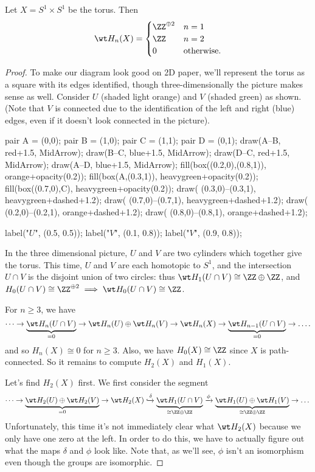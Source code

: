 \begin{proposition}
	Let $X = S^1 \times S^1$ be the torus.
	Then
	\[
		\wt H_n(X)
		=
		\begin{cases}
			\ZZ^{\oplus 2} & n = 1 \\
			\ZZ & n = 2 \\
			0 & \text{otherwise}.
		\end{cases}
	\]
\end{proposition}
\begin{proof}
	To make our diagram look good on 2D paper,
	we'll represent the torus as a square with its edges identified,
	though three-dimensionally the picture makes sense as well.
	Consider $U$ (shaded light orange) and $V$ (shaded green) as shown.
	(Note that $V$ is connected due to the identification of the left and right (blue) edges,
	even if it doesn't look connected in the picture).
	\begin{center}
		\begin{asy}
			pair A = (0,0);
			pair B = (1,0);
			pair C = (1,1);
			pair D = (0,1);
			draw(A--B, red+1.5, MidArrow);
			draw(B--C, blue+1.5, MidArrow);
			draw(D--C, red+1.5, MidArrow);
			draw(A--D, blue+1.5, MidArrow);
			fill(box((0.2,0),(0.8,1)), orange+opacity(0.2));
			fill(box(A,(0.3,1)), heavygreen+opacity(0.2));
			fill(box((0.7,0),C), heavygreen+opacity(0.2));
			draw( (0.3,0)--(0.3,1), heavygreen+dashed+1.2);
			draw( (0.7,0)--(0.7,1), heavygreen+dashed+1.2);
			draw( (0.2,0)--(0.2,1), orange+dashed+1.2);
			draw( (0.8,0)--(0.8,1), orange+dashed+1.2);

			label("$U$", (0.5, 0.5));
			label("$V$", (0.1, 0.8));
			label("$V$", (0.9, 0.8));
		\end{asy}
	\end{center}
	In the three dimensional picture, $U$ and $V$ are two cylinders which together give the torus.
	This time, $U$ and $V$ are each homotopic to $S^1$, and the intersection $U \cap V$
	is the disjoint union of two circles: thus $\wt H_1(U \cap V) \cong \ZZ \oplus \ZZ$,
	and $H_0(U \cap V) \cong \ZZ^{\oplus 2} \implies \wt H_0(U \cap V) \cong \ZZ$.

	For $n \ge 3$, we have
	\[
		\dots \to
		\underbrace{\wt H_n(U \cap V)}_{=0}
		\to \wt H_n(U) \oplus \wt H_n(V) \to \wt H_n(X) \to
		\underbrace{\wt H_{n-1}(U \cap V)}_{=0} \to \dots.
	\]
	and so $H_n(X) \cong 0$ for $n \ge 3$.
	Also, we have $H_0(X) \cong \ZZ$ since $X$ is path-connected.
	So it remains to compute $H_2(X)$ and $H_1(X)$.

	Let's find $H_2(X)$ first.
	We first consider the segment
	\[
		\dots \to
		\underbrace{\wt H_2(U) \oplus \wt H_2(V)}_{=0} \to \wt H_2(X) \xhookrightarrow{\delta}
		\underbrace{\wt H_1(U \cap V)}_{\cong \ZZ \oplus \ZZ} \xrightarrow{\phi}
		\underbrace{\wt H_1(U) \oplus \wt H_1(V)}_{\cong \ZZ \oplus \ZZ} \to \dots
	\]
	Unfortunately, this time it's not immediately clear what $\wt H_2(X)$ because
	we only have one zero at the left.
	In order to do this, we have to actually figure out what the maps $\delta$ and $\phi$ look like.
	Note that, as we'll see, $\phi$ isn't an isomorphism even though the groups are isomorphic.


\end{proof}
